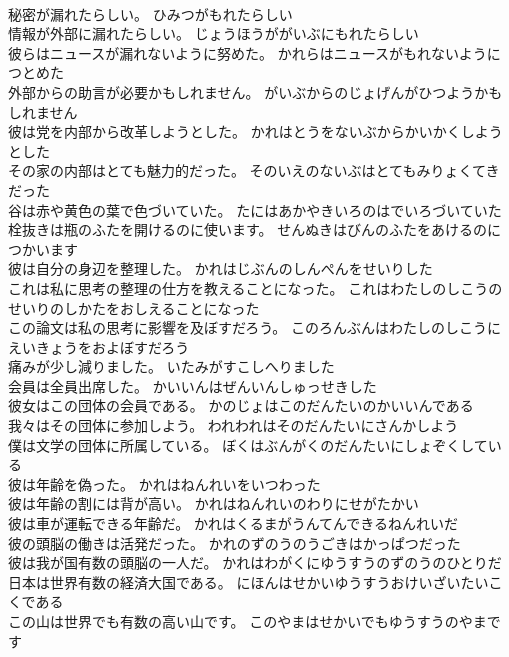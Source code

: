 \documentclass[8pt]{extreport}
\begin{document}
\begin{CJK}{UTF8}{min}
\\	秘密が漏れたらしい。	ひみつがもれたらしい 
\\	情報が外部に漏れたらしい。	じょうほうががいぶにもれたらしい 
\\	彼らはニュースが漏れないように努めた。	かれらはニュースがもれないようにつとめた 
\\	外部からの助言が必要かもしれません。	がいぶからのじょげんがひつようかもしれません 
\\	彼は党を内部から改革しようとした。	かれはとうをないぶからかいかくしようとした 
\\	その家の内部はとても魅力的だった。	そのいえのないぶはとてもみりょくてきだった 
\\	谷は赤や黄色の葉で色づいていた。	たにはあかやきいろのはでいろづいていた 
\\	栓抜きは瓶のふたを開けるのに使います。	せんぬきはびんのふたをあけるのにつかいます 
\\	彼は自分の身辺を整理した。	かれはじぶんのしんぺんをせいりした 
\\	これは私に思考の整理の仕方を教えることになった。	これはわたしのしこうのせいりのしかたをおしえることになった 
\\	この論文は私の思考に影響を及ぼすだろう。	このろんぶんはわたしのしこうにえいきょうをおよぼすだろう 
\\	痛みが少し減りました。	いたみがすこしへりました 
\\	会員は全員出席した。	かいいんはぜんいんしゅっせきした 
\\	彼女はこの団体の会員である。	かのじょはこのだんたいのかいいんである 
\\	我々はその団体に参加しよう。	われわれはそのだんたいにさんかしよう 
\\	僕は文学の団体に所属している。	ぼくはぶんがくのだんたいにしょぞくしている 
\\	彼は年齢を偽った。	かれはねんれいをいつわった 
\\	彼は年齢の割には背が高い。	かれはねんれいのわりにせがたかい 
\\	彼は車が運転できる年齢だ。	かれはくるまがうんてんできるねんれいだ 
\\	彼の頭脳の働きは活発だった。	かれのずのうのうごきはかっぱつだった 
\\	彼は我が国有数の頭脳の一人だ。	かれはわがくにゆうすうのずのうのひとりだ 
\\	日本は世界有数の経済大国である。	にほんはせかいゆうすうおけいざいたいこくである 
\\	この山は世界でも有数の高い山です。	このやまはせかいでもゆうすうのやまです 

\end{CJK}
\end{document}
